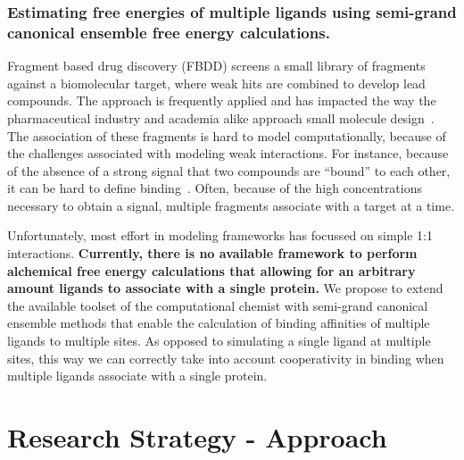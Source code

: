 \documentclass[10pt,final]{article}
\newif\ifinstr
\newcommand{\instr}[1]{\ifdraft{\ifinstr {\color{cyan}\emph{#1}} \fi}{}}
\begin{document}

 


\subsubsection*{Estimating free energies of multiple ligands using semi-grand canonical ensemble free energy calculations.}
Fragment based drug discovery (FBDD) screens a small library of fragments against a biomolecular target, where weak hits are combined to develop lead compounds.
%
The approach is frequently applied and has impacted the way the pharmaceutical industry and academia alike approach small molecule design~\autocite{Hajduk2007a}.
%
The association of these fragments is hard to model computationally, because of the challenges associated with modeling weak interactions.
%
For instance, because of the absence of a strong signal that two compounds are ``bound'' to each other, it can be hard to define binding~\autocite{Gilson1997a}.
%
Often, because of the high concentrations necessary to obtain a signal, multiple fragments associate with a target at a time.

Unfortunately, most effort in modeling frameworks has focussed on simple 1:1 interactions. 
%
\textbf{Currently, there is no available framework to perform alchemical free energy calculations that allowing for an arbitrary amount ligands to associate with a single protein.}
%
We propose to extend the available toolset of the computational chemist with semi-grand canonical ensemble methods that enable the calculation of binding affinities of multiple ligands to multiple sites.
%
As opposed to simulating a single ligand at multiple sites, this way we can correctly take into account cooperativity in binding when multiple ligands associate with a single protein.

\section*{Research Strategy - Approach}
\instr{Approach: More specific background information. Describe in detail the experimental design and research methods to be used. Technical hurdles to be overcome should be mentioned. Alternative approaches should be given for experiments that may not be feasible. Discussion of expected or possible results and their interpretation. Best format for each specific aim: a) rationale, b) methods, c) expected results, d) alternatives. Theory aims should follow a similar structure where possible.}
\end{document}
